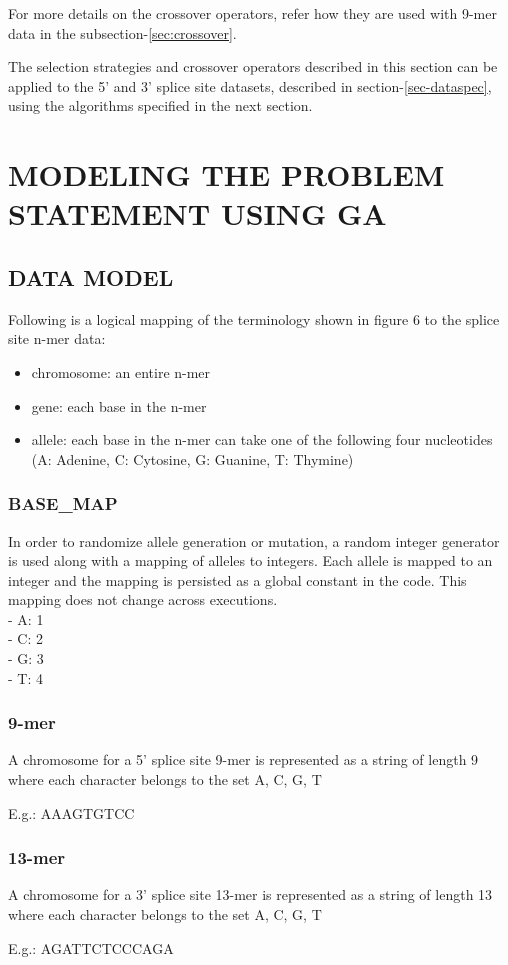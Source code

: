 \documentclass[12pt,a4paper]{article}
\begin{document}
	For more details on the crossover operators, refer how they are used with 9-mer data in the subsection-\ref{sec:crossover}. \par
	
	The selection strategies and crossover operators described in this section can be applied to the 5' and 3' splice site datasets, described in section-\ref{sec-dataspec}, using the algorithms specified in the next section.
	
	\section{MODELING THE PROBLEM STATEMENT USING GA} \label{sec:modelling}
	\subsection{DATA MODEL}
	Following is a logical mapping of the terminology shown in figure 6 to the splice site n-mer data:
	\begin{itemize}
		\item chromosome: an entire n-mer
		\item gene: each base in the n-mer
		\item allele: each base in the n-mer can take one of the following four nucleotides (A: Adenine, C: Cytosine, G: Guanine, T: Thymine)
	\end{itemize}
	
	\subsubsection{BASE\_MAP}
	In order to randomize allele generation or mutation, a random integer generator is used along with a mapping of alleles to integers. Each allele is mapped to an integer and the mapping is persisted as a global constant in the code. This mapping does not change across executions. \\
	- A: 1 \\
	- C: 2 \\
	- G: 3 \\
	- T: 4
	\subsubsection{9-mer}
	A chromosome for a 5’ splice site 9-mer is represented as a string of length 9 where each character belongs to the set {A, C, G, T} \par
	E.g.: AAAGTGTCC
	
	\subsubsection{13-mer}
	A chromosome for a 3’ splice site 13-mer is represented as a string of length 13 where each character belongs to the set {A, C, G, T} \par
	E.g.: AGATTCTCCCAGA
	
\end{document}
